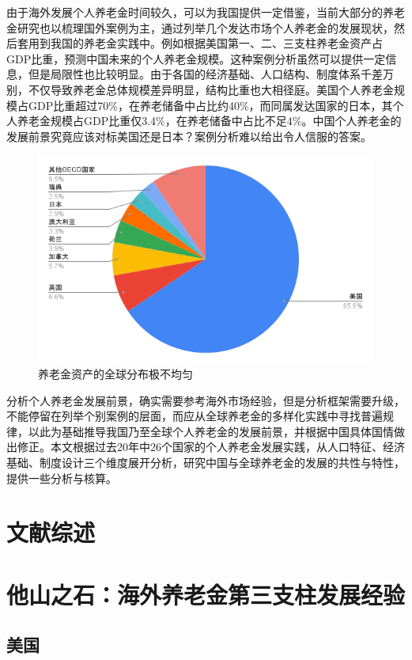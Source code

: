 \documentclass[a4paper,10.5pt]{ctexart}
\begin{document}
由于海外发展个人养老金时间较久，可以为我国提供一定借鉴，当前大部分的养老金研究也以梳理国外案例为主，通过列举几个发达市场个人养老金的发展现状，然后套用到我国的养老金实践中。例如根据美国第一、二、三支柱养老金资产占GDP比重，预测中国未来的个人养老金规模。这种案例分析虽然可以提供一定信息，但是局限性也比较明显。由于各国的经济基础、人口结构、制度体系千差万别，不仅导致养老金总体规模差异明显，结构比重也大相径庭。美国个人养老金规模占GDP比重超过70\%，在养老储备中占比约40\%，而同属发达国家的日本，其个人养老金规模占GDP比重仅3.4\%，在养老储备中占比不足4\%。中国个人养老金的发展前景究竟应该对标美国还是日本？案例分析难以给出令人信服的答案。
\begin{figure}[H]
    \includegraphics[width=\linewidth]{img/totalOECDpensionassets.png}
    \caption{养老金资产的全球分布极不均匀}
\end{figure}

分析个人养老金发展前景，确实需要参考海外市场经验，但是分析框架需要升级，不能停留在列举个别案例的层面，而应从全球养老金的多样化实践中寻找普遍规律，以此为基础推导我国乃至全球个人养老金的发展前景，并根据中国具体国情做出修正。本文根据过去20年中26个国家的个人养老金发展实践，从人口特征、经济基础、制度设计三个维度展开分析，研究中国与全球养老金的发展的共性与特性，提供一些分析与核算。
\section{文献综述}

\section{他山之石：海外养老金第三支柱发展经验}
\subsection{美国}
\end{document}
